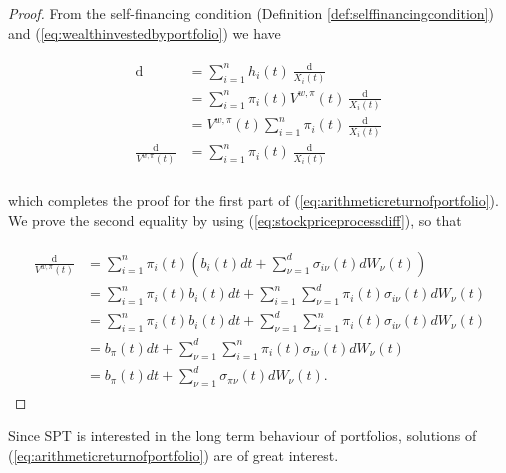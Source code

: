 \documentclass[british]{amsart} \usepackage{lmodern}
\numberwithin{equation}{section} \numberwithin{figure}{section}
\theoremstyle{plain} \newtheorem{thm}{\protect\theoremname}[section]
\theoremstyle{definition} \newtheorem{defn}[thm]{\protect\definitionname}
\theoremstyle{plain} \newtheorem{assumption}[thm]{\protect\assumptionname}
\theoremstyle{plain} \newtheorem{lem}[thm]{\protect\lemmaname}
\theoremstyle{plain} \newtheorem{prop}[thm]{\protect\propositionname}
\theoremstyle{remark} \newtheorem{rem}[thm]{\protect\remarkname}
\theoremstyle{plain} \newtheorem{cor}[thm]{\protect\corollaryname}
\renewcommand{\d}[1]{\mathop{\mathrm{d}{#1}}}
\begin{document}
\begin{proof}

  From the self-financing condition (Definition \ref{def:selffinancingcondition}) 
  and (\ref{eq:wealthinvestedbyportfolio}) we have

  \begin{gather*}
    \begin{split}
      \d{V^{w,\pi}(t)} 
      &= \sum_{i=1}^{n} h_{i}(t) \frac{\d{X_{i}(t)}}{X_{i}(t)} \\
      &= \sum_{i=1}^{n} \pi_{i}(t)V^{w,\pi}(t) \frac{\d{X_{i}(t)}}{X_{i}(t)} \\
      &= V^{w,\pi}(t) \sum_{i=1}^{n} \pi_{i}(t) \frac{\d{X_{i}(t)}}{X_{i}(t)} \\
      \frac{\d{V^{w,\pi}(t)}}{V^{w,\pi}(t)} 
      &= \sum_{i=1}^{n} \pi_{i}(t) \frac{\d{X_{i}(t)}}{X_{i}(t)} \\
    \end{split}
  \end{gather*}

   which completes the proof for the first part of (\ref{eq:arithmeticreturnofportfolio}). 
  We prove the second equality by using (\ref{eq:stockpriceprocessdiff}), so that
  
  \begin{gather*}
    \begin{split}
      \frac{\d{V^{w,\pi}(t)}}{V^{w,\pi}(t)}
          & = \sum_{i=1}^{n} \pi_{i}(t) 
          \left(
            b_{i}(t)dt + \sum_{\nu=1}^{d} \sigma_{i\nu}(t) dW_{\nu}(t)
          \right) \\
          & = \sum_{i=1}^{n} \pi_{i}(t) b_{i}(t)dt + 
              \sum_{i=1}^{n} \sum_{\nu=1}^{d} \pi_{i}(t) \sigma_{i\nu}(t) dW_{\nu}(t) \\
          & = \sum_{i=1}^{n} \pi_{i}(t) b_{i}(t)dt + 
              \sum_{\nu=1}^{d} \sum_{i=1}^{n} \pi_{i}(t) \sigma_{i\nu}(t) dW_{\nu}(t) \\
          & = b_{\pi}(t)dt + 
              \sum_{\nu=1}^{d} \sum_{i=1}^{n} \pi_{i}(t) \sigma_{i\nu}(t) dW_{\nu}(t) \\
          & = b_{\pi}(t)dt + 
              \sum_{\nu=1}^{d} \sigma_{\pi\nu}(t) dW_{\nu}(t).
    \end{split}
  \end{gather*}

\end{proof}

Since SPT is interested in the long term behaviour of portfolios, solutions of
(\ref{eq:arithmeticreturnofportfolio}) are of great interest. 
\end{document}
